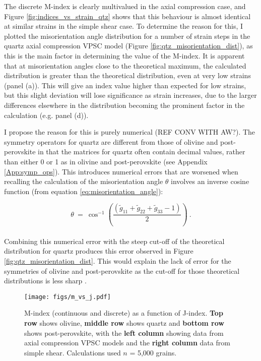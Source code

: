 \documentclass[a4paper,12pt,twoside]{report}
\numberwithin{equation}{chapter}
\begin{document}
The discrete M-index is clearly multivalued in the axial compression case, and Figure \ref{fig:indices_vs_strain_qtz} shows that this behaviour is almost identical at similar strains in the simple shear case. To determine the reason for this, I plotted the misorientation angle distribution for a number of strain steps in the quartz axial compression VPSC model (Figure \ref{fig:qtz_misorientation_dist}), as this is the main factor in determining the value of the M-index. It is apparent that at misorientation angles close to the theoretical maximum, the calculated distribution is greater than the theoretical distribution, even at very low strains (panel (a)). This will give an index value higher than expected for low strains, but this slight deviation will lose significance as strain increases, due to the larger differences elsewhere in the distribution becoming the prominent factor in the calculation (e.g. panel (d)).

I propose the reason for this is purely numerical (REF CONV WITH AW?). The symmetry operators for quartz are different from those of olivine and post-perovskite in that the matrices for quartz often contain decimal values, rather than either 0 or 1 as in olivine and post-perovskite (see Appendix \ref{App:symp_ops}). This introduces numerical errors that are worsened when recalling the calculation of the misorientation angle $\theta$ involves an inverse cosine function (from equation \ref{eq:misorientation_angle}):   

\begin{equation}
\theta\ =\ \cos^{-1}\left( \frac{(\tilde{g}_{11} + \tilde{g}_{22} + \tilde{g}_{33} - 1)}{2} \right)\ .
\end{equation}
\\
Combining this numerical error with the steep cut-off of the theoretical distribution for quartz produces this error observed in Figure \ref{fig:qtz_misorientation_dist}. This would explain the lack of error for the symmetries of olivine and post-perovskite as the cut-off for those theoretical distributions is less sharp \citep[see Figure \ref{fig:misorientation_example}, or][for more distributions]{Wheeler2001}.

\begin{figure*}[p]
  \centering
    \texttt{[image: figs/m\_vs\_j.pdf]}
  \caption[Relationship of M- and J-indices]{M-index (continuous and discrete) as a function of J-index. \textbf{Top row} shows olivine, \textbf{middle row} shows quartz and \textbf{bottom row} shows post-perovskite, with the \textbf{left column} showing data from axial compression VPSC models and the \textbf{right column} data from simple shear. Calculations used $n$ = 5,000 grains.} 
  \label{fig:m_vs_j}
\end{figure*} 
  
\end{document}
